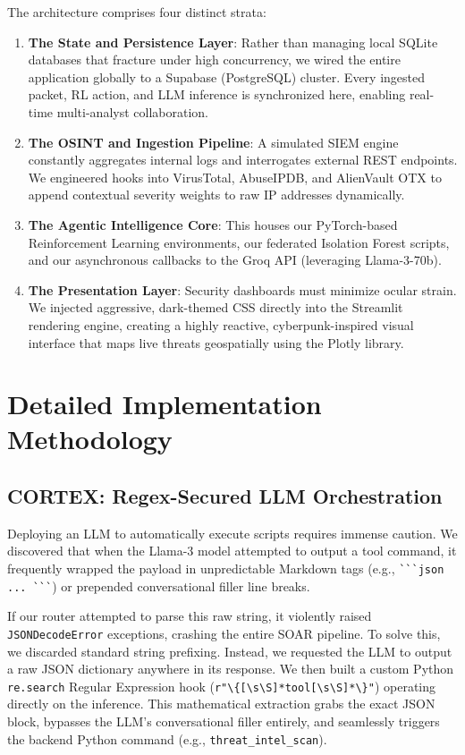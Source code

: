 \documentclass[conference]{IEEEtran}
\begin{document}
The architecture comprises four distinct strata:
\begin{enumerate}
    \item \textbf{The State and Persistence Layer}: Rather than managing local SQLite databases that fracture under high concurrency, we wired the entire application globally to a Supabase (PostgreSQL) cluster. Every ingested packet, RL action, and LLM inference is synchronized here, enabling real-time multi-analyst collaboration.
    \item \textbf{The OSINT and Ingestion Pipeline}: A simulated SIEM engine constantly aggregates internal logs and interrogates external REST endpoints. We engineered hooks into VirusTotal, AbuseIPDB, and AlienVault OTX to append contextual severity weights to raw IP addresses dynamically.
    \item \textbf{The Agentic Intelligence Core}: This houses our PyTorch-based Reinforcement Learning environments, our federated Isolation Forest scripts, and our asynchronous callbacks to the Groq API (leveraging Llama-3-70b).
    \item \textbf{The Presentation Layer}: Security dashboards must minimize ocular strain. We injected aggressive, dark-themed CSS directly into the Streamlit rendering engine, creating a highly reactive, cyberpunk-inspired visual interface that maps live threats geospatially using the Plotly library.
\end{enumerate}

\section{Detailed Implementation Methodology}

\subsection{CORTEX: Regex-Secured LLM Orchestration}
Deploying an LLM to automatically execute scripts requires immense caution. We discovered that when the Llama-3 model attempted to output a tool command, it frequently wrapped the payload in unpredictable Markdown tags (e.g., \verb|```json ... ```|) or prepended conversational filler line breaks. 

If our router attempted to parse this raw string, it violently raised \verb|JSONDecodeError| exceptions, crashing the entire SOAR pipeline. To solve this, we discarded standard string prefixing. Instead, we requested the LLM to output a raw JSON dictionary anywhere in its response. We then built a custom Python \verb|re.search| Regular Expression hook (\verb|r"\{[\s\S]*tool[\s\S]*\}"|) operating directly on the inference. This mathematical extraction grabs the exact JSON block, bypasses the LLM's conversational filler entirely, and seamlessly triggers the backend Python command (e.g., \verb|threat_intel_scan|). 
\end{document}
